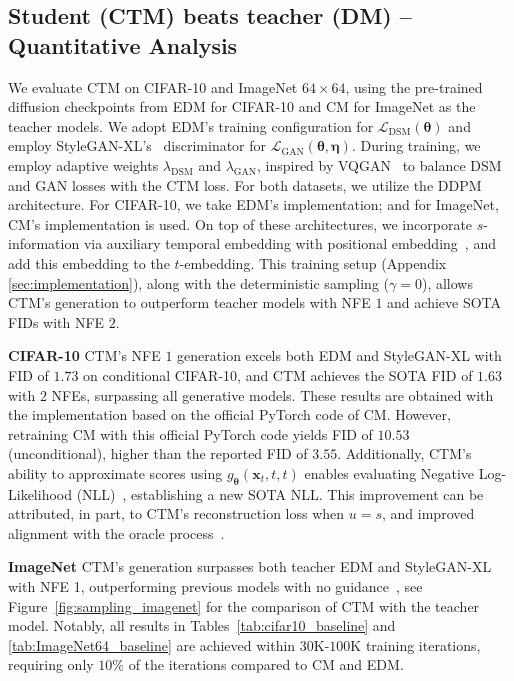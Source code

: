 \documentclass{article} \usepackage{iclr2024_coNFErence,times}
\theoremstyle{definition}
\theoremstyle{remark}
\begin{document}
\subsection{Student (CTM) beats teacher (DM) -- Quantitative Analysis}

We evaluate CTM on CIFAR-10 and ImageNet $64\times 64$, using the pre-trained diffusion checkpoints from EDM for CIFAR-10 and CM for ImageNet as the teacher models. We adopt EDM's training configuration for $\mathcal{L}_{\text{DSM}}(\bm{\theta})$ and employ StyleGAN-XL's~\citep{sauer2022stylegan} discriminator for $\mathcal{L}_{\text{GAN}}(\bm{\theta},\bm{\eta})$. During training, we employ adaptive weights $\lambda_{\text{DSM}}$ and $\lambda_{\text{GAN}}$, inspired by VQGAN~\citep{esser2021taming} to balance DSM and GAN losses with the CTM loss. For both datasets, we utilize the DDPM architecture. For CIFAR-10, we take EDM's implementation; and for ImageNet, CM's implementation is used.
On top of these architectures, we incorporate $s$-information via auxiliary temporal embedding with positional embedding~\citep{vaswani2017attention}, and add this embedding to the $t$-embedding. This training setup (Appendix \ref{sec:implementation}), along with the deterministic sampling ($\gamma=0$), allows CTM's generation to outperform teacher models with NFE $1$ and achieve SOTA FIDs with NFE $2$. 

\textbf{CIFAR-10 } CTM's NFE $1$ generation excels both EDM and StyleGAN-XL with FID of $1.73$ on conditional CIFAR-10, and CTM achieves the SOTA FID of $1.63$ with $2$ NFEs, surpassing all generative models. These results are obtained with the implementation based on the official PyTorch code of CM. However, retraining CM with this official PyTorch code yields FID of $10.53$ (unconditional), higher than the reported FID of $3.55$. Additionally, CTM's ability to approximate scores using $g_{\bm{\theta}}(\mathbf{x}_{t},t,t)$ enables evaluating Negative Log-Likelihood (NLL)~\citep{song2021maximum,kim2022maximum}, establishing a new SOTA NLL. This improvement can be attributed, in part, to CTM's reconstruction loss when $u=s$, and improved alignment with the oracle process~\citep{lai2023fp}.

\textbf{ImageNet } CTM's generation surpasses both teacher EDM and StyleGAN-XL with NFE 1, outperforming previous models with no guidance~\citep{dhariwal2021diffusion}, see Figure~\ref{fig:sampling_imagenet} for the comparison of CTM with the teacher model. Notably, all results in Tables~\ref{tab:cifar10_baseline} and \ref{tab:ImageNet64_baseline} are achieved within $30$K-$100$K training iterations, requiring only $10\%$ of the iterations compared to CM and EDM. 
\end{document}
